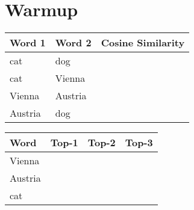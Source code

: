 \section{Warmup}

\begin{table}[hb]
\center
\begin{tabular}{|l|l|l|}
\hline
\textbf{Word 1} & \textbf{Word 2} & \textbf{Cosine Similarity} \\ \hline
cat             & dog             &                            \\ \hline
cat             & Vienna          &                            \\ \hline
Vienna          & Austria         &                            \\ \hline
Austria         & dog             &                            \\ \hline
\end{tabular}
\end{table}

\begin{table}[hb]
\center
\begin{tabular}{|l|l|l|l|}
\hline
\textbf{Word} & \textbf{Top-1} & \textbf{Top-2} & \textbf{Top-3} \\ \hline
Vienna        &                &                &                \\ \hline
Austria       &                &                &                \\ \hline
cat           &                &                &                \\ \hline
\end{tabular}
\end{table}

